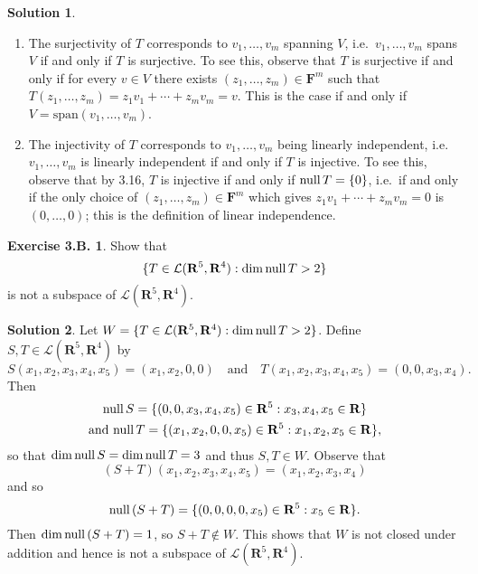 \documentclass[12pt]{article}
\theoremstyle{definition}
\theoremstyle{exercise}
\newtheorem{exercise}{Exercise 3.B.}
\theoremstyle{solution}
\newtheorem*{solution}{Solution}
\newcommand{\lmap}{\mathcal{L}}
\newcommand{\Span}{\text{span}}
\newcommand{\Null}{\text{null\,}}
\newcommand{\quand}{\quad \text{and} \quad}
\newcommand{\R}{\mathbf{R}}
\newcommand{\F}{\mathbf{F}}
\begin{document}
\begin{solution}
    \begin{enumerate}
        \item The surjectivity of \( T \) corresponds to \( v_1, \ldots, v_m \) spanning \( V \), i.e.\ \( v_1, \ldots, v_m \) spans \( V \) if and only if \( T \) is surjective. To see this, observe that \( T \) is surjective if and only if for every \( v \in V \) there exists \( (z_1, \ldots, z_m) \in \F^m \) such that \( T(z_1, \ldots, z_m) = z_1 v_1 + \cdots + z_m v_m = v \). This is the case if and only if \( V = \Span(v_1, \ldots, v_m) \).

        \item The injectivity of \( T \) corresponds to \( v_1, \ldots, v_m \) being linearly independent, i.e.\ \( v_1, \ldots, v_m \) is linearly independent if and only if \( T \) is injective. To see this, observe that by 3.16, \( T \) is injective if and only if \( \Null T = \{ 0 \} \), i.e.\ if and only if the only choice of \( (z_1, \ldots, z_m) \in \F^m \) which gives \( z_1 v_1 + \cdots + z_m v_m = 0 \) is \( (0, \ldots, 0) \); this is the definition of linear independence.
    \end{enumerate}
\end{solution}

\begin{exercise}
\label{ex:4}
    Show that
    \[
        \{ T \in \lmap(\R^5, \R^4) : \dim \Null T > 2 \}
    \]
    is not a subspace of \( \lmap(\R^5, \R^4) \).
\end{exercise}

\begin{solution}
    Let \( W = \{ T \in \lmap(\R^5, \R^4) : \dim \Null T > 2 \} \). Define \( S, T \in \lmap(\R^5, \R^4) \) by
    \[
        S(x_1, x_2, x_3, x_4, x_5) = (x_1, x_2, 0, 0) \quand T(x_1, x_2, x_3, x_4, x_5) = (0, 0, x_3, x_4).
    \]
    Then
    \begin{multline*}
        \Null S = \{ (0, 0, x_3, x_4, x_5) \in \R^5 : x_3, x_4, x_5 \in \R \} \\ \text{and } \Null T = \{ (x_1, x_2, 0, 0, x_5) \in \R^5 : x_1, x_2, x_5 \in \R \},
    \end{multline*}
    so that \( \dim \Null S = \dim \Null T = 3 \) and thus \( S, T \in W \). Observe that
    \[
        (S + T)(x_1, x_2, x_3, x_4, x_5) = (x_1, x_2, x_3, x_4)
    \]
    and so
    \[
        \Null (S + T) = \{ (0, 0, 0, 0, x_5) \in \R^5 : x_5 \in \R \}.
    \]
    Then \( \dim \Null (S + T) = 1 \), so \( S + T \not\in W \). This shows that \( W \) is not closed under addition and hence is not a subspace of \( \lmap(\R^5, \R^4) \).
\end{solution}
\end{document}

